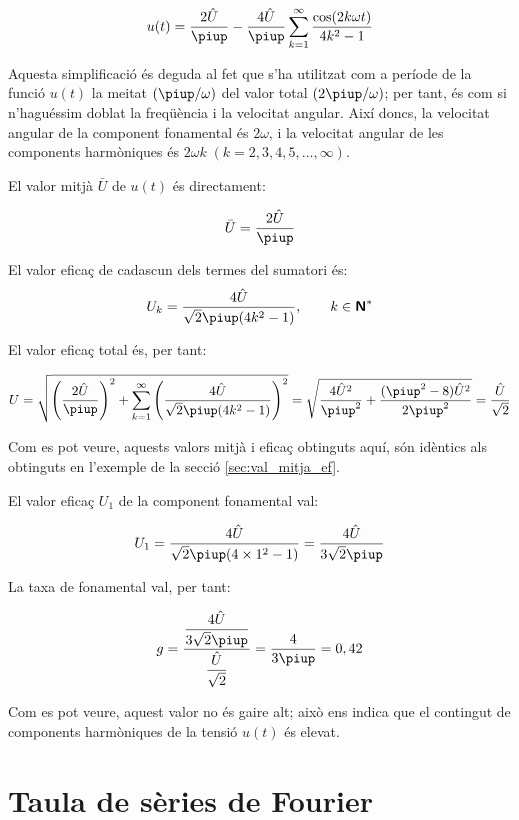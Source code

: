 \begin{exemple}[\ValorMitjaEfTaxaFon{}]
    \[
    u(t) = \frac{2\hat{U}}{\piup} - \frac{4\hat{U}}{\piup} \sum_{k=1}^\infty
          \frac{\cos(2 k \omega t)}{4k^2-1}
    \]

    Aquesta simplificació és deguda al fet que s'ha utilitzat com a
    període de la funció $u(t)$ la meitat $(\piup/\omega)$ del valor total
    $(2\piup/\omega)$; per tant, és com si n'haguéssim doblat la
    freqüència i la velocitat angular. Així doncs, la velocitat angular
    de la component fonamental és $2\omega$, i la velocitat angular de
    les components harmòniques és $2\omega k \;(k=2,3,4,5,\ldots,\infty)$.

    El valor mitjà $\bar{U}$ de $u(t)$ és directament:

    \[
        \bar{U} = \frac{2\hat{U}}{\piup}
    \]

    El valor eficaç de cadascun dels termes del sumatori és:
    \[
        U_k =\frac{4\hat{U}}{\sqrt{2}\piup(4k^2-1)},
        \qquad k \in \mathsfb{N}^*
    \]

    El valor eficaç total és, per tant:

    \[
        U=\sqrt{\left(\frac{2\hat{U}}{\piup}\right)^2 + \sum_{k=1}^\infty
        \left(\frac{4\hat{U}}{\sqrt{2}\piup(4k^2-1)}\right)^2} =
        \sqrt{\frac{4\hat{U}^2}{\piup^2} + \frac{(\piup^2-8)\hat{U}^2}{2\piup^2}
        }= \frac{\hat{U}}{\sqrt{2}}
    \]

    Com es pot veure, aquests valors mitjà i eficaç obtinguts aquí, són
    idèntics als obtinguts en l'exemple de la secció
    \ref{sec:val_mitja_ef}.

    El valor eficaç $U_1$ de la component fonamental val:

    \[
        U_1 =\frac{4\hat{U}}{\sqrt{2}\piup(4\times 1^2-1)} =
        \frac{4\hat{U}}{3\sqrt{2}\piup}
    \]

    La taxa de fonamental val, per tant:

    \[
        g =
        \frac{\dfrac{4\hat{U}}{3\sqrt{2}\piup}}{\dfrac{\hat{U}}{\sqrt{2}}}
        =\frac{4}{3\piup} = 0,{42}
    \]

    Com es pot veure, aquest valor no és gaire alt; això ens indica que
    el contingut de components harmòniques de la tensió $u(t)$ és
    elevat.
\end{exemple}


\section{Taula de sèries de Fourier}

